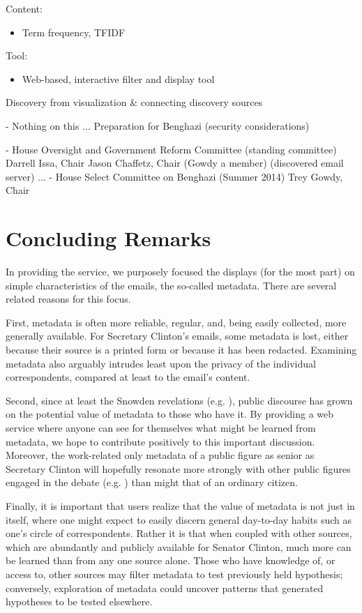 \documentclass[journal]{vgtc}                %
\begin{document}
   
 Content:
\begin{itemize}
\item Term frequency, TFIDF
\end{itemize}

   
 Tool: 
\begin{itemize}
\item Web-based, interactive filter and display tool
\end{itemize}
    
    
Discovery from visualization \& connecting discovery sources



- Nothing on this ... Preparation for Benghazi (security considerations)

- House Oversight and Government Reform Committee (standing committee) 
  Darrell Issa, Chair
     Jason Chaffetz, Chair (Gowdy a member)
  (discovered email server)
    ... 
- House Select Committee on Benghazi (Summer 2014) 
   Trey Gowdy, Chair
\section{Concluding Remarks}
In providing the service, we purposely focused the displays (for the most part) on simple characteristics of the emails, the so-called metadata.  There are several related reasons for this focus.  

First, metadata is often more reliable, regular, and, being easily collected, more generally available.  For Secretary Clinton's emails,  some metadata is lost, either because their source is a printed form or because it has been redacted.  Examining metadata also arguably intrudes least upon the privacy of the individual correspondents, compared at least to the email's content.  

Second, since at least the Snowden revelations (e.g. \cite{NYRsnowdenLeaks}), public discourse has grown on the potential value of metadata to those who have it.  By providing a web service where anyone can see for themselves what might be learned from metadata, we hope to contribute positively to this important discussion.  Moreover, the work-related only metadata of a public figure as senior as Secretary Clinton will hopefully resonate more strongly with other public figures  engaged in the debate (e.g.   \cite{NYRmetadata, ObamaMetadata, JebBushMetadata2015, PompeoMetadata, TrumpMetadata}) than might that of an ordinary citizen.  

Finally, it is important that users realize that the value of metadata is not just in itself, where one might expect to easily discern general day-to-day habits such as one's circle of correspondents.  Rather it is that when coupled with other sources, which are abundantly and publicly available for Senator Clinton, much more can be learned than from any one source alone.  Those who have knowledge of, or access to, other sources may filter metadata to test previously held hypothesis; conversely, exploration of metadata could uncover patterns that generated hypotheses to be tested elsewhere. 
\end{document}
